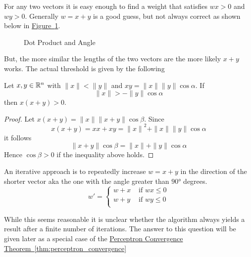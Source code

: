 For any two vectors it is easy enough to find a weight that satisfies \( wx > 0 \) and \( wy > 0 \).
Generally \( w = x + y \) is a good guess, but not always correct as shown below in
\hyperref[fig:vectorangle]{Figure~\ref*{fig:vectorangle}}.

\bigskip
\begin{figure}[H]
    \centering
    \plotvectorangle{}
    \caption{Dot Product and Angle}\label{fig:vectorangle}
\end{figure}
\bigskip

But, the more similar the lengths of the two vectors are the more likely \( x + y \) works.
The actual threshold is given by the following
\bigskip

\begin{lemma}
    Let \( x, y \in \mathbb{R}^n \) with \( \|x\| < \|y\| \) and \( xy = \|x\| \|y\| \cos\alpha \). If
    \[
        \|x\| > -\|y\|\cos\alpha
    \]
    then \( x(x + y) > 0 \).
\end{lemma}

\begin{proof}
    Let \( x(x + y) = \|x\| \|x + y\| \cos\beta \). Since
    \[
        x(x + y) = xx + xy = {\|x\|}^2 + \|x\| \|y\| \cos\alpha
    \]
    it follows
    \[
        {\|x + y\|}\cos\beta = \|x\| + \|y\|\cos\alpha
    \]
    Hence \( \cos\beta > 0 \) if the inequality above holds.
\end{proof}
\bigskip


An iterative approach is to repeatedly increase \( w = x + y \) in the direction of the shorter vector 
aka the one with the angle greater than \( \ang{90} \) degrees.
\[
    w' = \left \{
    \begin{array}{ll}
        w + x & \text{ if } w x \le 0 \\
        w + y & \text{ if } w y \le 0 \\
    \end{array}
    \right.
\]

While this seems reasonable it is unclear whether the algorithm always yields a result after 
a finite number of iterations. The answer to this question will be given later as a special case 
of the \hyperref[thm:perceptron_convergence]{Perceptron Convergence Theorem~\ref*{thm:perceptron_convergence}}
\bigskip


\begin{algorithm}[Weight]\label{algo:weight}
\end{algorithm}
\inputminted[fontsize=\small, framesep=0.35cm, frame=lines, python3=true]{python}{python/weight.py}
\bigskip


